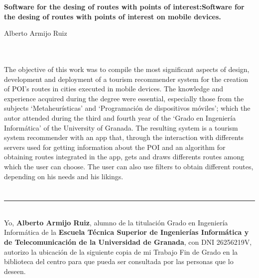 \begin{center}
{\large\bfseries Software for the desing of routes with points of interest:Software for the desing of routes with points of interest on mobile devices.}\\
\end{center}
\begin{center}
Alberto Armijo Ruiz\\
\end{center}

\\

\vspace{0.7cm}
\\
The objective of this work was to compile the most significant aspects of design, development and deployment of a tourism recommender system for the creation of POI's routes in cities executed in mobile devices.\newline
The knowledge and experience acquired during the degree were essential, especially those from the subjects \enquote*{Metaheurísticas} and \enquote*{Programación de dispositivos móviles}; which the autor attended during the third and fourth year of the \enquote*{Grado en Ingeniería Informática} of the University of Granada.\newline
The resulting system is a tourism system recommender with an app that, through the interaction with differents servers used for getting information about the POI and an algorithm for obtaining routes integrated in the app, gets and draws differents routes among which the user can choose. The user can also use filters to obtain different routes, depending on his needs and his likings.

\chapter*{}
\thispagestyle{empty}

\noindent\rule[-1ex]{\textwidth}{2pt}\\[4.5ex]

Yo, \textbf{Alberto Armijo Ruiz}, alumno de la titulación Grado en Ingeniería Informática de la \textbf{Escuela Técnica Superior
de Ingenierías Informática y de Telecomunicación de la Universidad de Granada}, con DNI 26256219V, autorizo la
ubicación de la siguiente copia de mi Trabajo Fin de Grado en la biblioteca del centro para que pueda ser
consultada por las personas que lo deseen.


